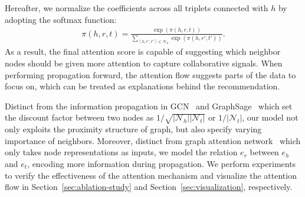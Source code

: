 \documentclass[sigconf]{acmart}
\newcommand{\Set}[1]{\mathcal{#1}}
\theoremstyle{definition}
\begin{document}
Hereafter, we normalize the coefficients across all triplets connected with $h$ by adopting the softmax function:
\begin{align}
    \pi(h,r,t)=\frac{\exp(\pi(h,r,t))}{\sum_{(h,r',t')\in\Set{N}_{h}}\exp(\pi(h,r',t'))}.
\end{align}
As a result, the final attention score is capable of suggesting which neighbor nodes should be given more attention to capture collaborative signals.
When performing propagation forward, the attention flow suggests parts of the data to focus on, which can be treated as explanations behind the recommendation.






Distinct from the information propagation in GCN~\cite{GCN} and GraphSage~\cite{GraphSage} which set the discount factor between two nodes as $1/\sqrt{|\Set{N}_{h}||\Set{N}_{t}|}$ or $1/|\Set{N}_{t}|$, our model not only exploits the proximity structure of graph, but also specify varying importance of neighbors.
Moreover, distinct from graph attention network~\cite{GAT} which only takes node representations as inputs, we model the relation $e_r$ between $e_h$ and $e_t$, encoding more information during propagation.
We perform experiments to verify the effectiveness of the attention mechanism and visualize the attention flow in Section~\ref{sec:ablation-study} and Section~\ref{sec:visualization}, respectively.
\end{document}
